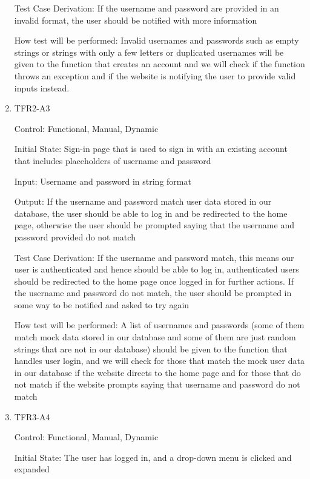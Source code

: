 \documentclass[12pt, titlepage]{article}
\begin{document}
\begin{enumerate}
  Test Case Derivation: If the username and password are provided in an invalid format, the user should be notified with more information
  
  How test will be performed: Invalid usernames and passwords such as empty strings or strings with only a few letters or duplicated usernames will be given to the function that creates an account and we will check if the function throws an exception and if the website is notifying the user to provide valid inputs instead.
  
  \item{TFR2-A3\\} \label{TFR2-A3}
  
  Control: Functional, Manual, Dynamic
            
  Initial State: Sign-in page that is used to sign in with an existing account that includes placeholders of username and password
            
  Input: Username and password in string format
            
  Output: If the username and password match user data stored in our database, the user should be able to log in and be redirected to the home page, otherwise the user should be prompted saying that the username and password provided do not match
  
  Test Case Derivation: If the username and password match, this means our user is authenticated and hence should be able to log in, authenticated users should be redirected to the home page once logged in for further actions. If the username and password do not match, the user should be prompted in some way to be notified and asked to try again
  
  How test will be performed: A list of usernames and passwords (some of them match mock data stored in our database and some of them are just random strings that are not in our database) should be given to the function that handles user login, and we will check for those that match the mock user data in our database if the website directs to the home page and for those that do not match if the website prompts saying that username and password do not match
  
  \item{TFR3-A4\\} \label{TFR3-A4}
  
  Control: Functional, Manual, Dynamic
            
  Initial State: The user has logged in, and a drop-down menu is clicked and expanded
            

\end{enumerate}
\end{document}
